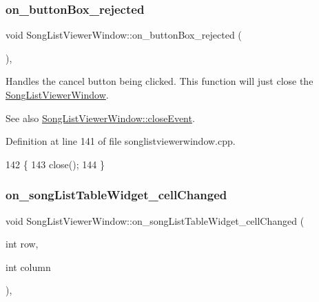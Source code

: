 \subsubsection{\texorpdfstring{on\+\_\+button\+Box\+\_\+rejected}{on\_buttonBox\_rejected}}
{\footnotesize\ttfamily void Song\+List\+Viewer\+Window\+::on\+\_\+button\+Box\+\_\+rejected (\begin{DoxyParamCaption}{ }\end{DoxyParamCaption})\hspace{0.3cm}{\ttfamily [private]}, {\ttfamily [slot]}}



Handles the cancel button being clicked. This function will just close the \mbox{\hyperlink{class_song_list_viewer_window}{Song\+List\+Viewer\+Window}}. 

\begin{DoxySeeAlso}{See also}
\mbox{\hyperlink{class_song_list_viewer_window_ad5f7f01b35b12fefb932fa8e10a83851}{Song\+List\+Viewer\+Window\+::close\+Event}}. 
\end{DoxySeeAlso}


Definition at line 141 of file songlistviewerwindow.\+cpp.


\begin{DoxyCode}
142 \{
143     close();
144 \}
\end{DoxyCode}
\mbox{\label{class_song_list_viewer_window_a51be8e61dee777db1408d4cd7da57070}} 
\subsubsection{\texorpdfstring{on\+\_\+song\+List\+Table\+Widget\+\_\+cell\+Changed}{on\_songListTableWidget\_cellChanged}}
{\footnotesize\ttfamily void Song\+List\+Viewer\+Window\+::on\+\_\+song\+List\+Table\+Widget\+\_\+cell\+Changed (\begin{DoxyParamCaption}\item[{int}]{row,  }\item[{int}]{column }\end{DoxyParamCaption})\hspace{0.3cm}{\ttfamily [private]}, {\ttfamily [slot]}}



